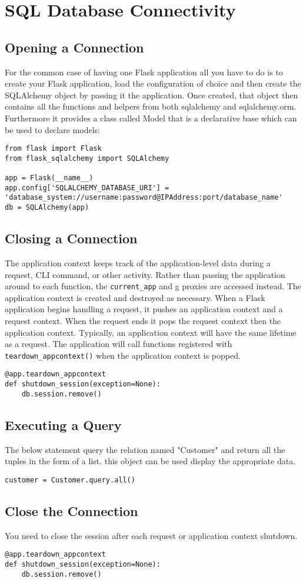 \chapter{SQL Database Connectivity}

\section{Opening a Connection}
For the common case of having one Flask application all you have to do is to create your Flask application, load the configuration of choice and then create the SQLAlchemy object by passing it the application.
Once created, that object then contains all the functions and helpers from both sqlalchemy and sqlalchemy.orm. Furthermore it provides a class called Model that is a declarative base which can be used to declare models:
\begin{verbatim}
from flask import Flask
from flask_sqlalchemy import SQLAlchemy

app = Flask(__name__)
app.config['SQLALCHEMY_DATABASE_URI'] = 'database_system://username:password@IPAddress:port/database_name'
db = SQLAlchemy(app)
\end{verbatim}
\thispagestyle{fancy}

\section{Closing a Connection}
The application context keeps track of the application-level data during a request, CLI command, or other activity.
Rather than passing the application around to each function, the \texttt{current\_app} and g proxies are accessed instead.
The application context is created and destroyed as necessary. When a Flask application begins handling a request,
it pushes an application context and a request context.
When the request ends it pops the request context then the application context.
Typically, an application context will have the same lifetime as a request.
The application will call functions registered with \texttt{teardown\_appcontext()} when the application context is popped.
\begin{verbatim}
@app.teardown_appcontext
def shutdown_session(exception=None):
    db.session.remove()
\end{verbatim}
\thispagestyle{fancy}
\section{Executing a Query}
The below statement query the relation named "Customer" and return all the tuples in the form of a list.
this object can be used display the appropriate data.
\begin{verbatim}
customer = Customer.query.all()
\end{verbatim}
\section{Close the Connection}
You need to close the session after each request or application context shutdown.
\begin{verbatim}
@app.teardown_appcontext
def shutdown_session(exception=None):
    db.session.remove()
\end{verbatim}
\thispagestyle{fancy}
